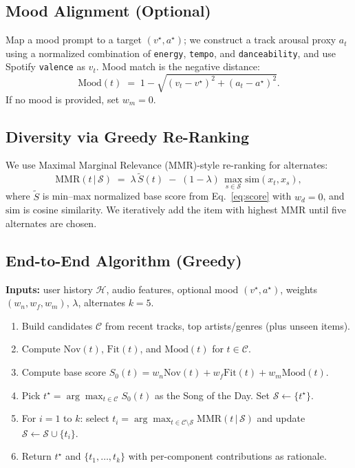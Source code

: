 \documentclass[11pt]{article}
\begin{document}
\subsection{Mood Alignment (Optional)}
Map a mood prompt to a target $(v^\star,a^\star)$; we construct a track arousal proxy $a_t$ using a normalized combination of \texttt{energy}, \texttt{tempo}, and \texttt{danceability}, and use Spotify \texttt{valence} as $v_t$. Mood match is the negative distance:
\begin{equation}
\mathrm{Mood}(t) \;=\; 1 - \sqrt{(v_t - v^\star)^2 + (a_t - a^\star)^2}.
\label{eq:mood}
\end{equation}
If no mood is provided, set $w_m=0$.

\subsection{Diversity via Greedy Re-Ranking}
We use Maximal Marginal Relevance (MMR)-style re-ranking for alternates:
\begin{equation}
\mathrm{MMR}(t\,|\,\mathcal{S}) \;=\; \lambda \,\widetilde{S}(t) \;-\; (1-\lambda)\,\max_{s \in \mathcal{S}} \mathrm{sim}(x_t, x_s),
\end{equation}
where $\widetilde{S}$ is min--max normalized base score from Eq.~\eqref{eq:score} with $w_d\!=\!0$, and $\mathrm{sim}$ is cosine similarity. We iteratively add the item with highest MMR until five alternates are chosen.

\subsection{End-to-End Algorithm (Greedy)}
\noindent\textbf{Inputs:} user history $\mathcal{H}$, audio features, optional mood $(v^\star,a^\star)$, weights $(w_n,w_f,w_m)$, $\lambda$, alternates $k{=}5$.
\begin{enumerate}[leftmargin=*]
  \item Build candidates $\mathcal{C}$ from recent tracks, top artists/genres (plus unseen items).
  \item Compute $\mathrm{Nov}(t)$, $\mathrm{Fit}(t)$, and $\mathrm{Mood}(t)$ for $t\in\mathcal{C}$.
  \item Compute base score $S_0(t) = w_n \mathrm{Nov}(t) + w_f \mathrm{Fit}(t) + w_m \mathrm{Mood}(t)$.
  \item Pick $t^\star = \arg\max_{t\in\mathcal{C}} S_0(t)$ as the Song of the Day. Set $\mathcal{S} \leftarrow \{t^\star\}$.
  \item For $i=1$ to $k$: select $t_i = \arg\max_{t\in\mathcal{C}\setminus\mathcal{S}} \mathrm{MMR}(t\,|\,\mathcal{S})$ and update $\mathcal{S} \leftarrow \mathcal{S} \cup \{t_i\}$.
  \item Return $t^\star$ and $\{t_1,\dots,t_k\}$ with per-component contributions as rationale.
\end{enumerate}
\end{document}
